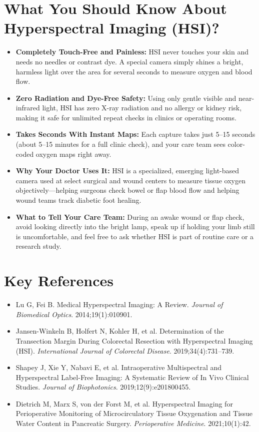 \section{What You Should Know About Hyperspectral Imaging (HSI)?}
\begin{itemize}
    \item \textbf{Completely Touch-Free and Painless:} HSI never touches your skin and needs no needles or contrast dye. A special camera simply shines a bright, harmless light over the area for several seconds to measure oxygen and blood flow.
    \item \textbf{Zero Radiation and Dye-Free Safety:} Using only gentle visible and near-infrared light, HSI has zero X-ray radiation and no allergy or kidney risk, making it safe for unlimited repeat checks in clinics or operating rooms.
    \item \textbf{Takes Seconds With Instant Maps:} Each capture takes just 5--15 seconds (about 5--15 minutes for a full clinic check), and your care team sees color-coded oxygen maps right away.
    \item \textbf{Why Your Doctor Uses It:} HSI is a specialized, emerging light-based camera used at select surgical and wound centers to measure tissue oxygen objectively---helping surgeons check bowel or flap blood flow and helping wound teams track diabetic foot healing.
    \item \textbf{What to Tell Your Care Team:} During an awake wound or flap check, avoid looking directly into the bright lamp, speak up if holding your limb still is uncomfortable, and feel free to ask whether HSI is part of routine care or a research study.
\end{itemize}

\section{Key References}
\begin{itemize}
    \item Lu G, Fei B. Medical Hyperspectral Imaging: A Review. \textit{Journal of Biomedical Optics}. 2014;19(1):010901.
    \item Jansen-Winkeln B, Holfert N, Kohler H, et al. Determination of the Transection Margin During Colorectal Resection with Hyperspectral Imaging (HSI). \textit{International Journal of Colorectal Disease}. 2019;34(4):731--739.
    \item Shapey J, Xie Y, Nabavi E, et al. Intraoperative Multispectral and Hyperspectral Label-Free Imaging: A Systematic Review of In Vivo Clinical Studies. \textit{Journal of Biophotonics}. 2019;12(9):e201800455.
    \item Dietrich M, Marx S, von der Forst M, et al. Hyperspectral Imaging for Perioperative Monitoring of Microcirculatory Tissue Oxygenation and Tissue Water Content in Pancreatic Surgery. \textit{Perioperative Medicine}. 2021;10(1):42.
\end{itemize}
